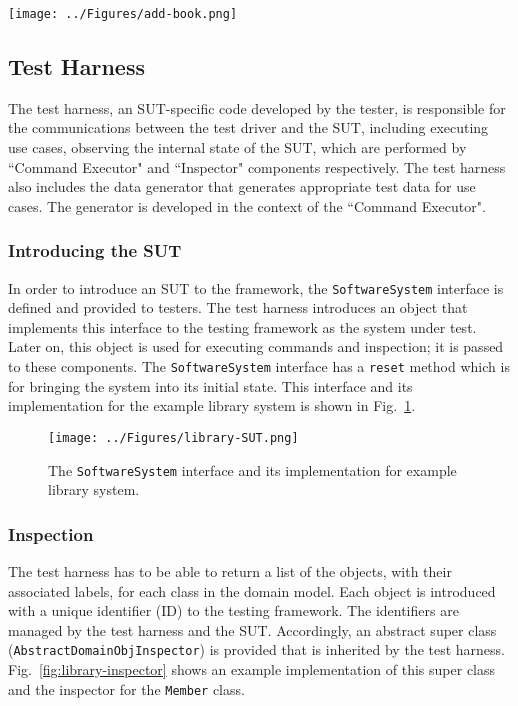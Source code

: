 \begin{figure*}[h]
\centering
\texttt{[image: ../Figures/add-book.png]}
\caption{Using the data types and their partitioning in use case modelling.}
\label{fig:library-usecase-add-book}
\end{figure*}

\subsection{Test Harness}
\label{sec:create-test model-test-harness}
The test harness, an SUT-specific code developed by the tester, is responsible for the communications between the test driver and the SUT, including executing use cases, observing the internal state of the SUT, which are performed by ``Command Executor" and ``Inspector" components respectively.
The test harness also includes the data generator that generates appropriate test data for use cases. The generator is developed in the context of the ``Command Executor".

\subsubsection{Introducing the SUT}
\label{sec:test-harness-intro-SUT}
In order to introduce an SUT to the framework, the \texttt{SoftwareSystem} interface is defined and provided to testers. The test harness introduces an object that implements this interface to the testing framework as the system under test. Later on, this object is used for executing commands and inspection; it is passed to these components. The \texttt{SoftwareSystem} interface has a \texttt{reset} method which is for bringing the system into its initial state. This interface and its implementation for the example library system is shown in Fig.~\ref{fig:library-SUT}.

\begin{figure}[h]
\centering
\texttt{[image: ../Figures/library-SUT.png]}
\caption{The \texttt{SoftwareSystem} interface and its implementation for example library system.}
\label{fig:library-SUT}
\end{figure}


\subsubsection{Inspection}
\label{sec:test-harness-inspection}
The test harness has to be able to return a list of the objects, with their associated labels, for each class in the domain model. Each object is introduced with a unique identifier (ID) to the testing framework. The identifiers are managed by the test harness and the SUT. Accordingly, an abstract super class (\texttt{AbstractDomainObjInspector})  is provided that is inherited by the test harness. Fig.~\ref{fig:library-inspector} shows an example implementation of this super class and the inspector for the \texttt{Member} class.

